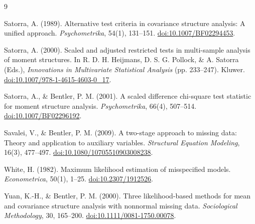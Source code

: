 \documentclass[11pt]{article}
\theoremstyle{plain}
\theoremstyle{remark}
\begin{document}
\begin{thebibliography}{9}

Satorra, A. (1989).
Alternative test criteria in covariance structure analysis: A unified approach.
\emph{Psychometrika}, 54(1), 131--151.
\href{https://doi.org/10.1007/BF02294453}{doi:10.1007/BF02294453}.

Satorra, A. (2000).
Scaled and adjusted restricted tests in multi-sample analysis of moment
structures. In R. D. H. Heijmans, D. S. G. Pollock, \& A. Satorra (Eds.),
\emph{Innovations in Multivariate Statistical Analysis} (pp. 233--247).
Kluwer.
\href{https://doi.org/10.1007/978-1-4615-4603-0_17}{doi:10.1007/978-1-4615-4603-0\_17}.

Satorra, A., \& Bentler, P. M. (2001).
A scaled difference chi-square test statistic for moment structure analysis.
\emph{Psychometrika}, 66(4), 507--514.
\href{https://doi.org/10.1007/BF02296192}{doi:10.1007/BF02296192}.

Savalei, V., \& Bentler, P. M. (2009).
A two-stage approach to missing data: Theory and application to auxiliary
variables.
\emph{Structural Equation Modeling}, 16(3), 477--497.
\href{https://doi.org/10.1080/10705510903008238}{doi:10.1080/10705510903008238}.

White, H. (1982).
Maximum likelihood estimation of misspecified models.
\emph{Econometrica}, 50(1), 1--25.
\href{https://doi.org/10.2307/1912526}{doi:10.2307/1912526}.

Yuan, K.-H., \& Bentler, P. M. (2000).
Three likelihood-based methods for mean and covariance structure analysis with
nonnormal missing data.
\emph{Sociological Methodology}, 30, 165--200.
\href{https://doi.org/10.1111/0081-1750.00078}{doi:10.1111/0081-1750.00078}.

\end{thebibliography}
\end{document}
